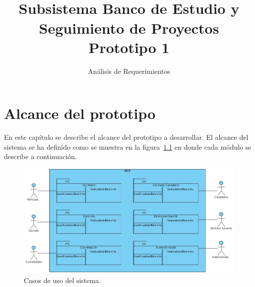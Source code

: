 \documentclass[10pt]{book}
\title{\Sistema \\\LARGE{Subsistema Banco de Estudio y Seguimiento de Proyectos \\{\bf Prototipo 1}}}
\subtitle{Análisis de Requerimientos}
\begin{document}
\maketitle\thispagestyle{empty}

\frontmatter
\tableofcontents

\mainmatter


\chapter{Alcance del prototipo}

	En este capítulo se describe el alcance del prototipo a desarrollar. El alcance del sistema se ha definido como se muestra en la figura~\ref{fig:casosDeUsoCompleto} en donde cada módulo se describe a continuación.

\begin{figure}[htbp!]
	\begin{center}
		\includegraphics[width=1\textwidth]{images/alcance.jpg}
		\caption{Casos de uso del sistema.}
		\label{fig:casosDeUsoCompleto}
	\end{center}
\end{figure}
\end{document}
